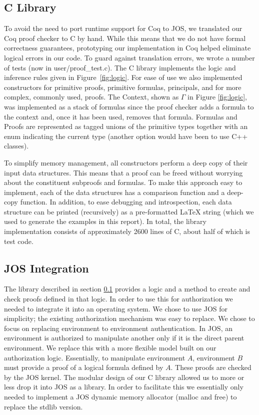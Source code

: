 \documentclass[10pt]{article}
\begin{document}
\subsection{C Library} \label{sec:clib}
To avoid the need to port runtime support for Coq to JOS, we translated our Coq proof checker to C by hand.
While this means that we do not have formal correctness guarantees, prototyping our implementation in Coq helped eliminate logical errors in our code. To guard against translation errors, we wrote a number of tests (now in \textsf{user/proof\_test.c}).  The C library implements the logic and inference rules given in Figure~\ref{fig:logic}.  For ease of use we also implemented constructors for primitive proofs, primitive formulas, principals, and for more complex, commonly used, proofs.  The Context, shown as $\Gamma$ in Figure \ref{fig:logic}, was implemented as a stack of formulas since the proof checker adds a formula to the context and, once it has been used, removes that formula.  Formulas and Proofs are represented as tagged \textsf{union}s of the primitive types together with an \textsf{enum} indicating the current type (another option would have been to use C++ classes).  

To simplify memory management, all constructors perform a deep copy of their input data structures. This means that a proof can be freed without worrying about the constituent subproofs and formulas.  To make this approach easy to implement, each of the data structures has a comparison function and a deep-copy function.  In addition, to ease debugging and introspection, each data structure can be printed (recursively) as a pre-formatted \LaTeX{ } string (which we used to generate the examples in this report).  In total, the library implementation consists of approximately 2600 lines of C, about half of which is test code.

\subsection{JOS Integration}\label{sec:jos}
The library described in section \ref{sec:clib} provides a logic and a method to create and check proofs defined in that logic.  In order to use this for authorization we needed to integrate it into an operating system.  We chose to use JOS for simplicity; the existing authorization mechanism was easy to replace.  We chose to focus on replacing environment to environment authentication.  In JOS, an environment is authorized to manipulate another only if it is the direct parent environment. We replace this with a more flexible model built on our authorization logic.  Essentially, to manipulate environment $A$, environment $B$ must provide a proof of a logical formula defined by $A$.  These proofs are checked by the JOS kernel. The modular design of our C library allowed us to more or less drop it into JOS as a library.  In order to facilitate this we essentially only needed to implement a JOS dynamic memory allocator (\textsf{malloc} and \textsf{free}) to replace the \textsf{stdlib} version.
\end{document}
